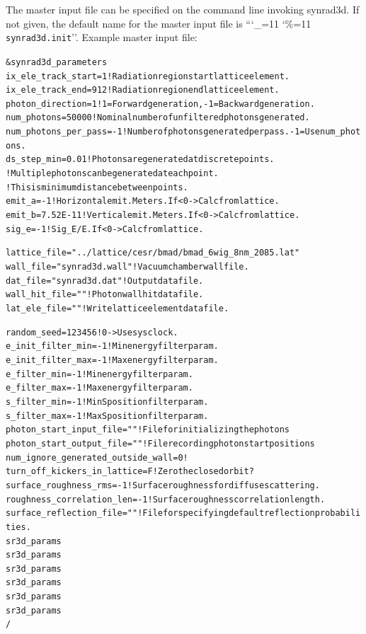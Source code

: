 \documentclass[11pt]{article}
\newcommand\ttcmd{\begingroup\catcode`\_=11 \catcode`\%=11 \dottcmd}
\newcommand\dottcmd[1]{\texttt{#1}\endgroup}
\newcommand{\vn}{\ttcmd}
\newlength{\ExBeg}
\newlength{\ExEnd}
\newenvironment{example}
  {\vspace{\ExBeg} \begin{alltt}}
  {\end{alltt} \vspace{\ExEnd}}
\begin{document}
The master input file can be specified on the command line invoking synrad3d.
If not given, the default name for the master input file is ``\vn{synrad3d.init}''.
Example master input file:
\begin{example}
  &synrad3d_parameters
    ix_ele_track_start   = 1      ! Radiation region start lattice element.
    ix_ele_track_end     = 912    ! Radiation region end lattice element.
    photon_direction     = 1      ! 1 = Forward generation, -1 = Backward generation.
    num_photons          = 50000  ! Nominal number of unfiltered photons generated. 
    num_photons_per_pass = -1     ! Number of photons generated per pass. -1 = Use num_photons.
    ds_step_min          = 0.01   ! Photons are generated at discrete points. 
                              ! Multiple photons can be generated at each point.
                              ! This is minimum distance between points.
    emit_a       = -1         ! Horizontal emit. Meters. If < 0 -> Calc from lattice.
    emit_b       = 7.52E-11   ! Vertical emit.  Meters. If < 0 -> Calc from lattice.
    sig_e        = -1         ! Sig_E/E. If < 0 -> Calc from lattice.

    lattice_file = "../lattice/cesr/bmad/bmad_6wig_8nm_2085.lat" 
    wall_file    = "synrad3d.wall"   ! Vacuum chamber wall file.
    dat_file     = "synrad3d.dat"    ! Output data file.
    wall_hit_file = ""               ! Photon wall hit data file.
    lat_ele_file  = ""               ! Write lattice element data file.

    random_seed = 123456             ! 0 -> Use sys clock.
    e_init_filter_min = -1           ! Min energy filter param.
    e_init_filter_max = -1           ! Max energy filter param.
    e_filter_min = -1                ! Min energy filter param.
    e_filter_max = -1                ! Max energy filter param.
    s_filter_min = -1                ! Min S position filter param.
    s_filter_max = -1                ! Max S position filter param.
    photon_start_input_file  = ""    ! File for initializing the photons
    photon_start_output_file = ""    ! File recording photon start positions
    num_ignore_generated_outside_wall = 0    !
    turn_off_kickers_in_lattice = F          ! Zero the closed orbit?
    surface_roughness_rms       = -1         ! Surface roughness for diffuse scattering.
    roughness_correlation_len   = -1         ! Surface roughness correlation length.
    surface_reflection_file     = ""         ! File for specifying default reflection probabilities.
    sr3d_params%
    sr3d_params%
    sr3d_params%
    sr3d_params%
    sr3d_params%
    sr3d_params%
  /
\end{example}
\end{document}
